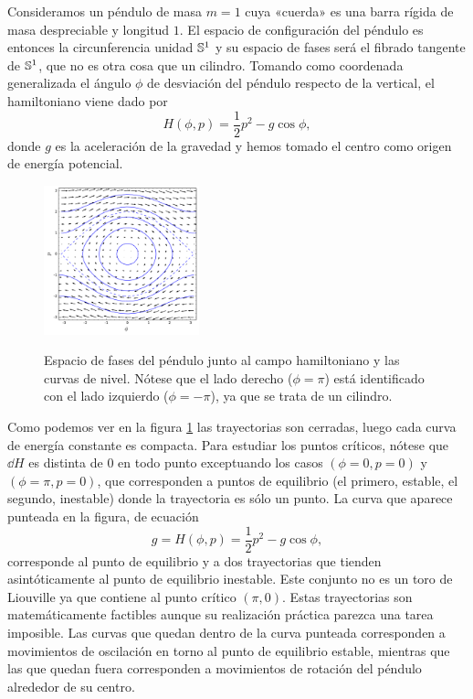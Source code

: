   Consideramos un péndulo de masa $m=1$ cuya «cuerda» es una barra rígida de masa despreciable y longitud $1$. El espacio de configuración del péndulo es entonces la circunferencia unidad $\mathbb{S}^1$ y su espacio de fases será el fibrado tangente de $\mathbb{S}^1$, que no es otra cosa que un cilindro. Tomando como coordenada generalizada el ángulo $\phi$ de desviación del péndulo respecto de la vertical, el hamiltoniano viene dado por 
  \begin{equation*}
    H(\phi,p)=\frac{1}{2}p^2 - g\cos\phi,
  \end{equation*}
  donde $g$ es la aceleración de la gravedad y hemos tomado el centro como origen de energía potencial.
  \begin{figure}[h]
    \centering
    \includegraphics[width=0.4\textwidth]{pics/pendulo}
    \label{fig:pendulo}
    \caption{\small Espacio de fases del péndulo junto al campo hamiltoniano y las curvas de nivel. Nótese que el lado derecho ($\phi=\pi$) está identificado con el lado izquierdo ($\phi=-\pi$), ya que se trata de un cilindro.}
  \end{figure}
  Como podemos ver en la figura \ref{fig:pendulo}  las trayectorias son cerradas, luego cada curva de energía constante es compacta. Para estudiar los puntos críticos, nótese que $\dd H$ es distinta de 0 en todo punto exceptuando los casos $(\phi=0,p=0)$ y $(\phi=\pi,p=0)$, que corresponden a puntos de equilibrio (el primero, estable, el segundo, inestable) donde la trayectoria es sólo un punto. La curva que aparece punteada en la figura, de ecuación
  \begin{equation*}
    g=H(\phi,p)=\frac{1}{2}p^2 - g \cos\phi ,
  \end{equation*}
   corresponde al punto de equilibrio y a dos trayectorias que tienden asintóticamente al punto de equilibrio inestable. Este conjunto no es un toro de Liouville ya que contiene al punto crítico $(\pi,0)$. Estas trayectorias son matemáticamente factibles aunque su realización práctica parezca una tarea imposible. Las curvas que quedan dentro de la curva punteada corresponden a movimientos de oscilación en torno al punto de equilibrio estable, mientras que las que quedan fuera corresponden a movimientos de rotación del péndulo alrededor de su centro. 

